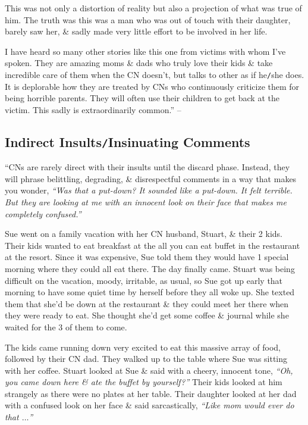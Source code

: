 \documentclass{article}
\numberwithin{equation}{section}
\begin{document}
This was not only a distortion of reality but also a projection of what was true of him. The truth was this was a man who was out of touch with their daughter, barely saw her, \& sadly made very little effort to be involved in her life.

I have heard so many other stories like this one from victims with whom I've spoken. They are amazing moms \& dads who truly love their kids \& take incredible care of them when the CN doesn't, but talks to other as if he\texttt{/}she does. It is deplorable how they are treated by CNs who continuously criticize them for being horrible parents. They will often use their children to get back at the victim. This sadly is extraordinarily common.'' -- \cite[pp. 82--84]{Mirza2017}

\subsection{Indirect Insults\texttt{/}Insinuating Comments}
``CNs are rarely direct with their insults until the discard phase. Instead, they will phrase belittling, degrading, \& disrespectful comments in a way that makes you wonder, \textit{``Was that a put-down? It sounded like a put-down. It felt terrible. But they are looking at me with an innocent look on their face that makes me completely confused.''}

Sue went on a family vacation with her CN husband, Stuart, \&  their 2 kids. Their kids wanted to eat breakfast at the all you can eat buffet in the restaurant at the resort. Since it was expensive, Sue told them they would have 1 special morning where they could all eat there. The day finally came. Stuart was being difficult on the vacation, moody, irritable, as usual, so Sue got up early that morning to have some quiet time by herself before they all woke up. She texted them that she'd be down at the restaurant \& they could meet her there when they were ready to eat. She thought she'd get some coffee \& journal while she waited for the 3 of them to come.

The kids came running down very excited to eat this massive array of food, followed by their CN dad. They walked up to the table where Sue was sitting with her coffee. Stuart looked at Sue \& said with a cheery, innocent tone, \textit{``Oh, you came down here \& ate the buffet by yourself?''} Their kids looked at him strangely as there were no plates at her table. Their daughter looked at her dad with a confused look on her face \& said sarcastically, \textit{``Like mom would ever do that $\ldots$''}
\end{document}
